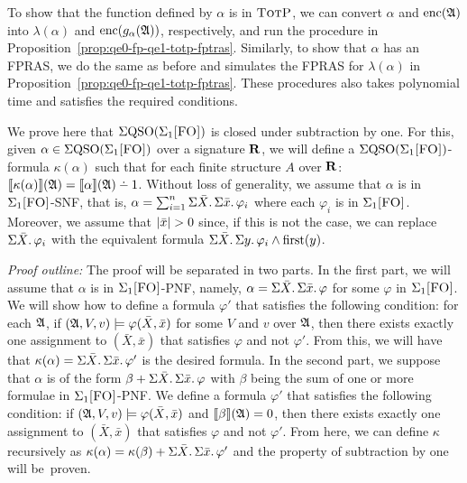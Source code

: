 To show that the function defined by $\alpha$ is in $\text{\sc TotP}$, we can convert $\alpha$ and ${\rm enc}(\mathfrak{A})$ into $\lambda(\alpha)$ and ${\rm enc}(g_{\alpha}(\mathfrak{A}))$, respectively, and run the procedure in Proposition~\ref{prop:qe0-fp-qe1-totp-fptras}. Similarly, to show that $\alpha$ has an FPRAS, we do the same as before and simulates the FPRAS for $\lambda(\alpha)$ in Proposition~\ref{prop:qe0-fp-qe1-totp-fptras}. These procedures also takes polynomial time and satisfies the required conditions.

\medskip


 We prove here that $\Sigma{\rm QSO}(\Sigma_{1}\textsc{[FO]})$ is closed under subtraction by one. 
For this, given $\alpha \in \Sigma{\rm QSO}(\Sigma_{1}\textsc{[FO]})$ over a signature $\mathbf{R}$, we will define a $\Sigma{\rm QSO}(\Sigma_{1}\textsc{[FO]})$-formula $\kappa(\alpha)$ such that for each finite structure $A$ over $\mathbf{R}$: $\sem{\kappa(\alpha)}(\A) = \sem{\alpha}(\A) \dotminus 1$. 
Without loss of generality, we assume that $\alpha$ is in $\Sigma_{1}\textsc{[FO]}$-SNF, that is, $\alpha = \sum_{i = 1}^{n}\Sigma{\bar{X}}.\,\Sigma{\bar{x}}.\,\varphi_i$ where each $\varphi_i$ is in $\Sigma_{1}\textsc{[FO]}$. Moreover, we assume that $\vert \bar{x} \vert > 0$  since, if this is not the case, we can replace $\Sigma{\bar{X}}.\,\varphi_i$ with the equivalent formula $\Sigma{\bar{X}}.\, \Sigma{y}.\, \varphi_i \wedge\operatorname{first}(y)$.

{\em Proof outline:} The proof will be separated in two parts. In the first part, we will assume that  $\alpha$ is in $\Sigma_{1}\textsc{[FO]}$-PNF, namely, $\alpha = \Sigma{\bar{X}}.\,\Sigma{\bar{x}}.\,\varphi$ for some $\varphi$ in $\Sigma_{1}\textsc{[FO]}$. We will show how to define a formula $\varphi'$ that satisfies the following condition: for each $\mathfrak{A}$, if $(\mathfrak{A},V,v)\models \varphi(\bar{X},\bar{x})$ for some $V$ and $v$ over $\mathfrak{A}$, then there exists exactly one assignment to $(\bar{X},\bar{x})$ that satisfies $\varphi$ and not $\varphi'$. 
From this, we will have that $\kappa(\alpha) = \Sigma{\bar{X}}.\,\Sigma{\bar{x}}.\,\varphi'$ is the desired formula. In the second part, we suppose that $\alpha$ is of the form $\beta + \Sigma{\bar{X}}.\,\Sigma{\bar{x}}.\,\varphi$ with $\beta$ being the sum of one or more formulae in $\Sigma_{1}\textsc{[FO]}$-PNF. 
We define a formula $\varphi'$ that satisfies the following condition: if $(\mathfrak{A},V,v)\models \varphi(\bar{X},\bar{x})$ and ${\llbracket{}{\beta}\rrbracket}(\mathfrak{A}) = 0$, then there exists exactly one assignment to $(\bar{X},\bar{x})$ that satisfies $\varphi$ and not $\varphi'$. From here, we can define $\kappa$ recursively as  $\kappa(\alpha) = \kappa(\beta) +  \Sigma{\bar{X}}.\,\Sigma{\bar{x}}.\,\varphi'$ and the property of subtraction by one will be~proven.

